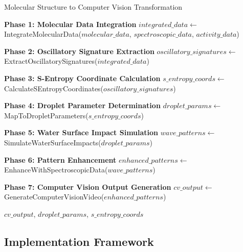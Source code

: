 \documentclass[12pt,a4paper]{article}
\begin{document}
\begin{algorithm}
\caption{Molecular Structure to Computer Vision Transformation}
\begin{algorithmic}[1]
    \State \textbf{Phase 1: Molecular Data Integration}
    \State $integrated\_data \gets$ IntegrateMolecularData($molecular\_data$, $spectroscopic\_data$, $activity\_data$)

    \State \textbf{Phase 2: Oscillatory Signature Extraction}
    \State $oscillatory\_signatures \gets$ ExtractOscillatorySignatures($integrated\_data$)

    \State \textbf{Phase 3: S-Entropy Coordinate Calculation}
    \State $s\_entropy\_coords \gets$ CalculateSEntropyCoordinates($oscillatory\_signatures$)

    \State \textbf{Phase 4: Droplet Parameter Determination}
    \State $droplet\_params \gets$ MapToDropletParameters($s\_entropy\_coords$)

    \State \textbf{Phase 5: Water Surface Impact Simulation}
    \State $wave\_patterns \gets$ SimulateWaterSurfaceImpacts($droplet\_params$)

    \State \textbf{Phase 6: Pattern Enhancement}
    \State $enhanced\_patterns \gets$ EnhanceWithSpectroscopicData($wave\_patterns$)

    \State \textbf{Phase 7: Computer Vision Output Generation}
    \State $cv\_output \gets$ GenerateComputerVisionVideo($enhanced\_patterns$)

    \State \Return $cv\_output$, $droplet\_params$, $s\_entropy\_coords$
\EndProcedure
\end{algorithmic}
\end{algorithm}

\subsection{Implementation Framework}
\end{document}
